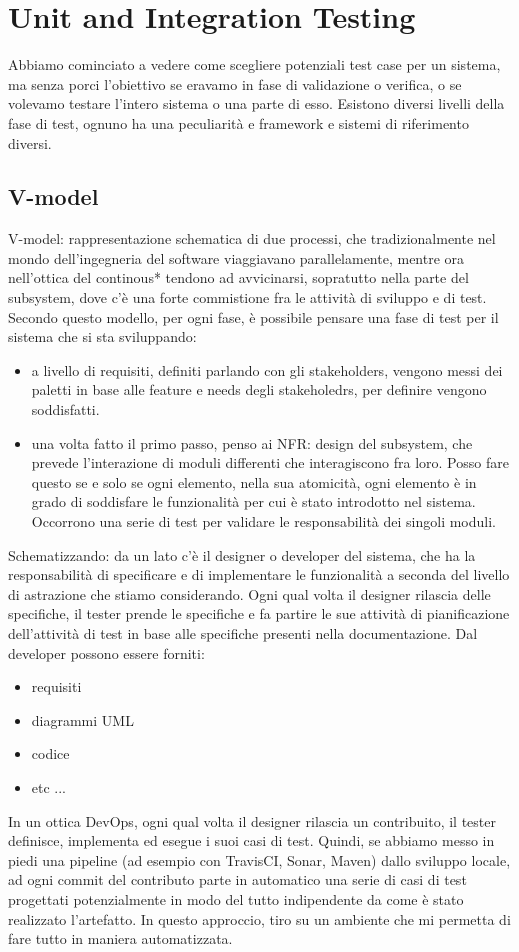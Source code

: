 \documentclass{article}
\begin{document}
\section{Unit and Integration Testing}
Abbiamo cominciato a vedere come scegliere potenziali test case per un sistema, ma senza porci l'obiettivo se eravamo in fase di validazione o verifica, o se volevamo testare l'intero sistema o una parte di esso. Esistono diversi livelli della fase di test, ognuno ha una peculiarità e framework e sistemi di riferimento diversi. 
\subsection{V-model}
V-model: rappresentazione schematica di due processi, che tradizionalmente nel mondo dell'ingegneria del software viaggiavano parallelamente, mentre ora nell'ottica del continous* tendono ad avvicinarsi, sopratutto nella parte del subsystem, dove c'è una forte commistione fra le attività di sviluppo e di test. Secondo questo modello, per ogni fase, è possibile pensare una fase di test per il sistema che si sta sviluppando:
\begin{itemize}
\item a livello di requisiti, definiti parlando con gli stakeholders, vengono messi dei paletti in base alle feature e needs degli stakeholedrs, per definire vengono soddisfatti.
\item una volta fatto il primo passo, penso ai NFR: design del subsystem, che prevede l'interazione di moduli differenti che interagiscono fra loro. Posso fare questo se e solo se ogni elemento, nella sua atomicità, ogni elemento è in grado di soddisfare le funzionalità per cui è stato introdotto nel sistema. Occorrono una serie di test per validare le responsabilità dei singoli moduli.
\end{itemize}
Schematizzando: da un lato c'è il designer o developer del sistema, che ha la responsabilità di specificare e di implementare le funzionalità a seconda del livello di astrazione che stiamo considerando. Ogni qual volta il designer rilascia delle specifiche, il tester prende le specifiche e fa partire le sue attività di pianificazione dell'attività di test in base alle specifiche presenti nella documentazione. Dal developer possono essere forniti:
\begin{itemize}
\item requisiti
\item diagrammi UML
\item codice
\item etc ...
\end{itemize}
In un ottica DevOps, ogni qual volta il designer rilascia un contribuito, il tester definisce, implementa ed esegue i suoi casi di test. Quindi, se abbiamo messo in piedi una pipeline (ad esempio con TravisCI, Sonar, Maven) dallo sviluppo locale, ad ogni commit del contributo parte in automatico una serie di casi di test progettati potenzialmente in modo del tutto indipendente da come è stato realizzato l'artefatto. In questo approccio, tiro su un ambiente che mi permetta di fare tutto in maniera automatizzata.
\end{document}
